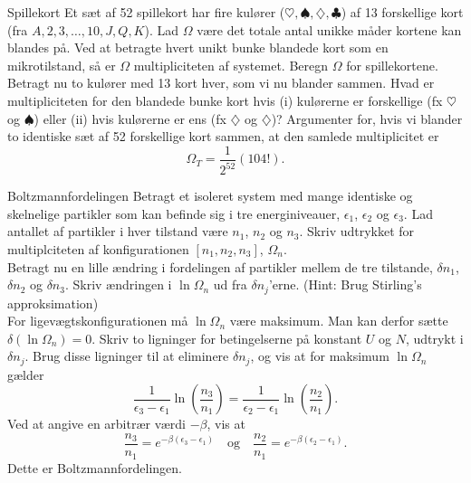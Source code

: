 \begin{opgave}{Spillekort}
    Et sæt af 52 spillekort har fire kulører ($\heartsuit,\spadesuit,\diamondsuit,\clubsuit$) af 13 forskellige kort (fra $A,2,3,\dots,10,J,Q,K$). 
    \opg Lad $\Omega$ være det totale antal unikke måder kortene kan blandes på. Ved at betragte hvert unikt bunke blandede kort som en mikrotilstand, så er $\Omega$ multipliciteten af systemet. Beregn $\Omega$ for spillekortene.
    \opg Betragt nu to kulører med 13 kort hver, som vi nu blander sammen. Hvad er multipliciteten for den blandede bunke kort hvis (i) kulørerne er forskellige (fx $\heartsuit$ og $\spadesuit$) eller (ii) hvis kulørerne er ens (fx $\diamondsuit$ og $\diamondsuit$)?
    \opg Argumenter for, hvis vi blander to identiske sæt af 52 forskellige kort sammen, at den samlede multiplicitet er
    \[ \Omega_T=\frac{1}{2^{52}}(104!). \]
\end{opgave}

\begin{opgave}{Boltzmannfordelingen}
    Betragt et isoleret system med mange identiske og skelnelige partikler som kan befinde sig i tre energiniveauer, $\epsilon_1$, $\epsilon_2$ og $\epsilon_3$. Lad antallet af partikler i hver tilstand være $n_1$, $n_2$ og $n_3$.
    \opg Skriv udtrykket for multiplciteten af konfigurationen $[n_1,n_2,n_3]$, $\Omega_n$.\\
    Betragt nu en lille ændring i fordelingen af partikler mellem de tre tilstande, $\delta n_1$, $\delta n_2$ og $\delta n_3$.
    \opg Skriv ændringen i $\ln \Omega_n$ ud fra $\delta n_j$'erne. (Hint: Brug Stirling's approksimation)\\
    For ligevægtskonfigurationen må $\ln\Omega_n$ være maksimum. Man kan derfor sætte $\delta(\ln\Omega_n)=0$.
    \opg Skriv to ligninger for betingelserne på konstant $U$ og $N$, udtrykt i $\delta n_j$.
    \opg Brug disse ligninger til at eliminere $\delta n_j$, og vis at for maksimum $\ln\Omega_n$ gælder
    \[ \frac{1}{\epsilon_3-\epsilon_1}\ln\left(\frac{n_3}{n_1}\right)=\frac{1}{\epsilon_2-\epsilon_1}\ln\left(\frac{n_2}{n_1}\right). \]
    \opg Ved at angive en arbitrær værdi $-\beta$, vis at
    \[ \frac{n_3}{n_1}=e^{-\beta(\epsilon_3-\epsilon_1)}\quad\text{og}\quad\frac{n_2}{n_1}=e^{-\beta(\epsilon_2-\epsilon_1)}. \] 
    Dette er Boltzmannfordelingen.
\end{opgave}

